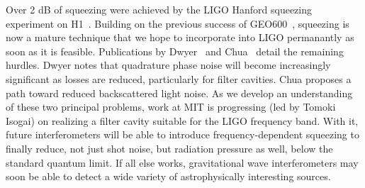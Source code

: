 
	    Over 2 dB of squeezing were achieved by the LIGO Hanford squeezing experiment on H1~\cite{BarsottiNatureSqueezing}. Building on the previous success of GEO600~\cite{GEO600NatureSqueezing}, squeezing is now a mature technique that we hope to incorporate into LIGO permanantly as soon as it is feasible.
Publications by Dwyer~\cite{DwyerPhaseNoise} and Chua~\cite{ChuaBackscatteredLight} detail the remaining hurdles.
Dwyer notes that quadrature phase noise will become increasingly significant as losses are reduced, particularly for filter cavities.
Chua proposes a path toward reduced backscattered light noise.
As we develop an understanding of these two principal problems, work at MIT is progressing (led by Tomoki Isogai) on realizing a filter cavity suitable for the LIGO frequency band.
With it, future interferometers will be able to introduce frequency-dependent squeezing to finally reduce, not just shot noise, but radiation pressure as well, below the standard quantum limit.
If all else works, gravitational wave interferometers may soon be able to detect a wide variety of astrophysically interesting sources.





